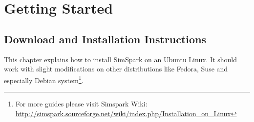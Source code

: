 
 \chapter{Getting Started}
\label{cha:getstarted}

\section{Download and Installation Instructions}
\label{section:install}

This chapter explains how to install SimSpark on an Ubuntu Linux. It should work with
slight modifications on other distributions like Fedora, Suse and
especially Debian system\footnote{For more guides please visit Simspark Wiki:
\url{http://simspark.sourceforge.net/wiki/index.php/Installation_on_Linux}}.

